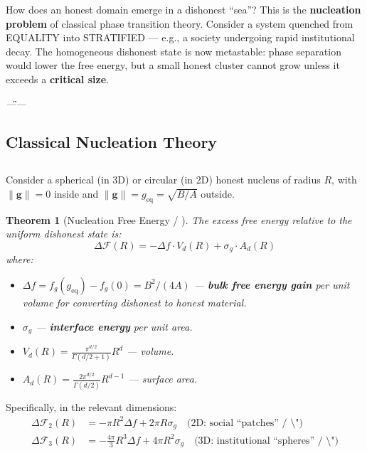 \documentclass[12pt,a4paper]{article}
\theoremstyle{plain}
\newtheorem{theorem}{ Theorem}[section]
\theoremstyle{definition}
\newcommand{\cF}{\mathcal{F}}
\newcommand{\gf}{\mathbf{g}}          %
\newcommand{\cn}[1]{\textcolor{scxgray}{\textit{#1}}}
\begin{document}
How does an honest domain emerge in a dishonest ``sea''? This is the
\textbf{nucleation problem} of classical phase transition theory. Consider
a system quenched from EQUALITY into STRATIFIED — e.g., a society undergoing
rapid institutional decay. The homogeneous dishonest state is now metastable:
phase separation would lower the free energy, but a small honest cluster
cannot grow unless it exceeds a \textbf{critical size}.

\bigskip
\noindent
\cn{\"\"——}

\subsection{Classical Nucleation Theory}
\subsection*{}

Consider a spherical (in 3D) or circular (in 2D) honest nucleus of radius
$R$, with $\|\gf\|=0$ inside and $\|\gf\|=g_{\text{eq}}=\sqrt{B/A}$ outside.

\begin{theorem}[Nucleation Free Energy / ]
\label{thm:nucleation_energy}
The excess free energy relative to the uniform dishonest state is:
\begin{equation}
    \Delta \cF(R) = -\Delta f \cdot V_d(R) + \sigma_g \cdot A_d(R)
    \label{eq:nucleation_energy}
\end{equation}
where:
\begin{itemize}
    \item $\Delta f = f_g(g_{\text{eq}}) - f_g(0) = B^2/(4A)$ —
          \textbf{bulk free energy gain} per unit volume for converting
          dishonest to honest material.
    \item $\sigma_g$ — \textbf{interface energy} per unit area.
    \item $V_d(R) = \frac{\pi^{d/2}}{\Gamma(d/2+1)} R^d$ — volume.
    \item $A_d(R) = \frac{2\pi^{d/2}}{\Gamma(d/2)} R^{d-1}$ — surface area.
\end{itemize}
\end{theorem}

Specifically, in the relevant dimensions:
\begin{align}
    \Delta \cF_2(R) &= -\pi R^2 \Delta f + 2\pi R \sigma_g
    \quad\text{(2D: social ``patches'' / \"\")}
    \label{eq:nucleation_2d} \\[4pt]
    \Delta \cF_3(R) &= -\frac{4\pi}{3} R^3 \Delta f + 4\pi R^2 \sigma_g
    \quad\text{(3D: institutional ``spheres'' / \"\")}
    \label{eq:nucleation_3d}
\end{align}
\end{document}
